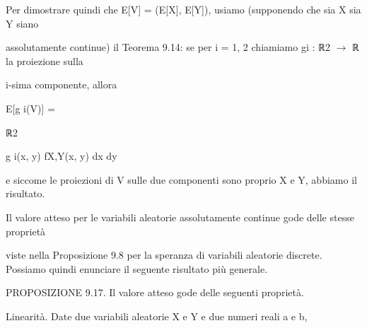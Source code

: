 \documentclass[a4paper,portrait,12pt]{article}
\begin{document}
\begin{flushleft}
Per dimostrare quindi che E[V] = (E[X], E[Y]), usiamo (supponendo che sia X sia Y siano
\end{flushleft}


\begin{flushleft}
assolutamente continue) il Teorema 9.14: se per i = 1, 2 chiamiamo gi : ℝ2 $\rightarrow$ ℝ la proiezione sulla
\end{flushleft}


\begin{flushleft}
i-sima componente, allora
\end{flushleft}


\begin{flushleft}
E[g i(V)] =
\end{flushleft}





\begin{flushleft}
ℝ2
\end{flushleft}





\begin{flushleft}
g i(x, y) fX,Y(x, y) dx dy
\end{flushleft}





\begin{flushleft}
e siccome le proiezioni di V sulle due componenti sono proprio X e Y, abbiamo il risultato.
\end{flushleft}


\begin{flushleft}
Il valore atteso per le variabili aleatorie assolutamente continue gode delle stesse propriet\`{a}
\end{flushleft}


\begin{flushleft}
viste nella Proposizione 9.8 per la speranza di variabili aleatorie discrete. Possiamo quindi enunciare il seguente risultato più generale.
\end{flushleft}


\begin{flushleft}
PROPOSIZIONE 9.17. Il valore atteso gode delle seguenti propriet\`{a}.
\end{flushleft}


\begin{flushleft}
Linearit\`{a}. Date due variabili aleatorie X e Y e due numeri reali a e b,
\end{flushleft}
\end{document}

